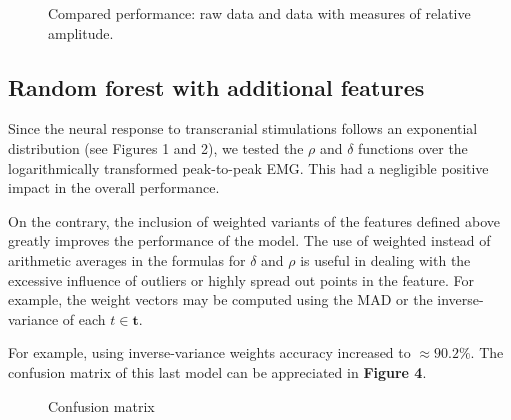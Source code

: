 \documentclass{article}
\begin{document}
\begin{multicols}{2}
\begin{figure}[H]
  \centering
  \hfill
  \caption{Compared performance: raw data and data with measures of relative
  amplitude.}
  \label{fig:two_images}
\end{figure}


\subsection{Random forest with additional features}

Since the neural response to transcranial stimulations follows an exponential
distribution (see Figures 1 and 2), we tested the $\rho$ and $\delta$ functions
over the logarithmically transformed peak-to-peak EMG. This had a negligible
positive impact in the overall performance.

On the contrary, the inclusion of weighted variants of the features defined
above greatly improves the performance of the model. The use of weighted instead
of arithmetic averages in the formulas for $\delta$ and $\rho$ is useful in
dealing with the excessive influence of outliers or highly spread out points in
the feature. For example, the weight vectors may be computed using the MAD or
the inverse-variance of each $t \in \textbf{t}$. 

For example, using inverse-variance weights accuracy increased to $\approx
90.2\%$. The confusion matrix of this last model can be appreciated in
\textbf{Figure 4}.

\begin{figure}[H]
    \centering
    \caption{Confusion matrix}
    \label{fig:figure4}
\end{figure}


\end{multicols}
\end{document}
